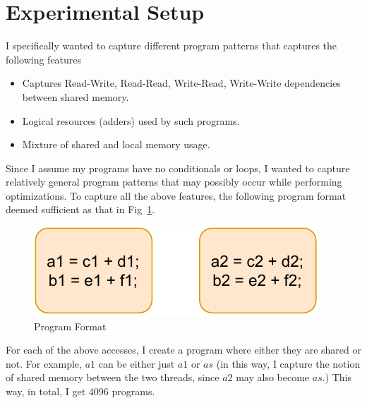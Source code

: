 
\section{Experimental Setup}

    I specifically wanted to capture different program patterns that captures the following features
    \begin{itemize}
        \item Captures Read-Write, Read-Read, Write-Read, Write-Write dependencies between shared memory.
        \item Logical resources (adders) used by such programs.
        \item Mixture of shared and local memory usage.
    \end{itemize}

    Since I assume my programs have no conditionals or loops, I wanted to capture relatively general program patterns that may possibly occur while performing optimizations. 
    To capture all the above features, the following program format deemed sufficient as that in Fig~\ref{P1}.
    \begin{figure}[H]
        \centering
        \includegraphics[scale=0.5]{Prog.pdf}
        \caption{Program Format}
        \label{P1}
    \end{figure}

    For each of the above accesses, I create a program where either they are shared or not. 
    For example, $a1$ can be either just $a1$ or $as$ (in this way, I capture the notion of shared memory between the two threads, since $a2$ may also become $as$.)
    This way, in total, I get 4096 programs. 





